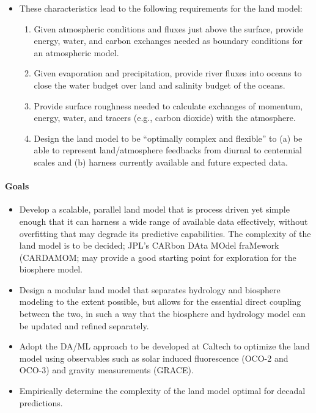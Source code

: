 \documentclass{article}
\begin{document}
\begin{itemize}
    \item These characteristics lead to the following requirements for the land model:
    \begin{enumerate}
        \item Given atmospheric conditions and fluxes just above the surface, provide energy, water, and carbon exchanges needed as boundary conditions for an atmospheric model.
        \item Given evaporation and precipitation, provide river fluxes into oceans to close the water budget over land and salinity budget of the oceans. 
        \item Provide surface roughness needed to calculate exchanges of momentum, energy, water, and tracers (e.g., carbon dioxide) with the atmosphere.
        \item Design the land model to be ``optimally complex and flexible'' to (a) be able to represent land/atmosphere feedbacks from diurnal to centennial scales and (b) harness currently available and future expected data.
    \end{enumerate}
\end{itemize}

\paragraph{Goals}
\begin{itemize}
\item Develop a scalable, parallel land model that is process driven yet simple enough that it can harness a wide range of available data effectively, without overfitting that may degrade its predictive capabilities. The complexity of the land model is to be decided; JPL's CARbon DAta MOdel fraMework (CARDAMOM; \citet{Bloom16a} may provide a good starting point for exploration for the biosphere model. 
\item Design a modular land model that separates hydrology and biosphere modeling to the extent possible, but allows for the essential direct coupling between the two, in such a way that the biosphere and hydrology model can be updated and refined separately. 
\item Adopt the DA/ML approach to be developed at Caltech to optimize the land model using observables such as solar induced fluorescence (OCO-2 and OCO-3) and gravity measurements (GRACE).
\item Empirically determine the complexity of the land model optimal for decadal predictions.
\end{itemize}
\end{document}
